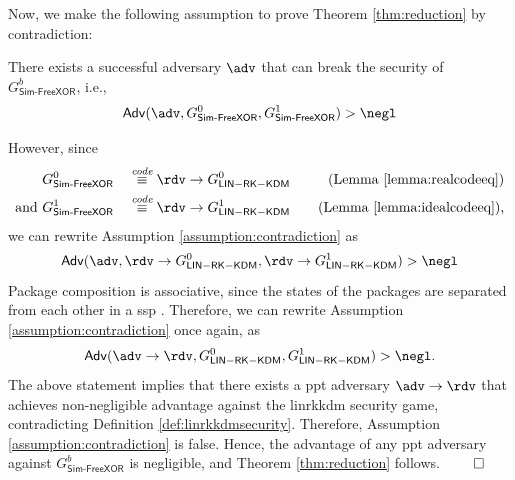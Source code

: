 

Now, we make the following assumption to prove Theorem \ref{thm:reduction} by contradiction:
\begin{assumption}\label{assumption:contradiction}
    There exists a successful adversary $\adv$ that can break the security of $G^{b}_\mathsf{Sim\text{-}FreeXOR}$, i.e.,
    \[\mathsf{Adv}(\adv, G^{0}_\mathsf{Sim\text{-}FreeXOR}, G^{1}_\mathsf{Sim\text{-}FreeXOR}) > \negl\]  
\end{assumption}
However, since 
\[\begin{aligned}
    &G^{0}_\mathsf{Sim\text{-}FreeXOR} &&\codeequiv \rdv\to G^{0}_{\mathsf{LIN-RK-KDM}} &&&\text{(Lemma \ref{lemma:realcodeeq})} \\
    \text{and }&G^{1}_\mathsf{Sim\text{-}FreeXOR} &&\codeequiv \rdv\to G^{1}_{\mathsf{LIN-RK-KDM}} &&&\text{(Lemma \ref{lemma:idealcodeeq})} \text{,}
\end{aligned}\]
we can rewrite Assumption \ref{assumption:contradiction} as
\[\mathsf{Adv}(\adv, \rdv\to G^{0}_{\mathsf{LIN-RK-KDM}}, \rdv\to G^{1}_{\mathsf{LIN-RK-KDM}}) > \negl\]
Package composition is associative, since the states of the packages are separated from each other in a \acrlong{ssp} \cite[Section III(C)]{CSF:BrzOec23}. Therefore, we can rewrite Assumption \ref{assumption:contradiction} once again, as
\[\mathsf{Adv}(\adv\to\rdv, G^{0}_{\mathsf{LIN-RK-KDM}}, G^{1}_{\mathsf{LIN-RK-KDM}}) > \negl\text{.}\]
The above statement implies that there exists a \acrshort{ppt} adversary $\adv\to\rdv$ that achieves non-negligible advantage against the \acrshort{linrkkdm} security game, contradicting Definition \ref{def:linrkkdmsecurity}. 
Therefore, Assumption \ref{assumption:contradiction} is false. Hence, the advantage of any \acrshort{ppt} adversary against $G^{b}_\mathsf{Sim\text{-}FreeXOR}$ is negligible, and Theorem \ref{thm:reduction} follows. $\qed$